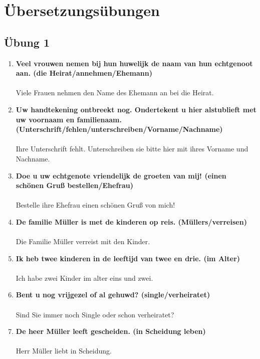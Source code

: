 \documentclass[main.tex]{subfiles}
\begin{document}
\chapter{Übersetzungsübungen}
\section{Übung 1}
\begin{enumerate}
\item \textbf{Veel vrouwen nemen bij hun huwelijk de naam van hun echtgenoot aan. (die Heirat/annehmen/Ehemann)}\\ \\
Viele Frauen nehmen den Name des Ehemann an bei die Heirat.\\
\item \textbf{Uw handtekening ontbreekt nog. Ondertekent u hier alstublieft met uw voornaam en familienaam. (Unterschrift/fehlen/unterschreiben/Vorname/Nachname)}\\ \\
Ihre Unterschrift fehlt. Unterschreiben sie bitte hier mit ihres Vorname und Nachname.
\\
\item \textbf{Doe u uw echtgenote vriendelijk de groeten van mij! (einen schönen Gruß bestellen/Ehefrau)}\\ \\
Bestelle ihre Ehefrau einen schönen Gruß von mich!
\\
\item \textbf{De familie Müller is met de kinderen op reis. (Müllers/verreisen)}\\ \\
Die Familie Müller verreist mit den Kinder.
\\
\item \textbf{Ik heb twee kinderen in de leeftijd van twee en drie. (im Alter)}\\ \\
Ich habe zwei Kinder im alter eins und zwei.
\\
\item \textbf{Bent u nog vrijgezel of al gehuwd? (single/verheiratet)}\\ \\
Sind Sie immer noch Single oder schon verheiratet?
\\
\item \textbf{De heer Müller leeft gescheiden. (in Scheidung leben)}\\ \\
Herr Müller liebt in Scheidung.

\end{enumerate}
\end{document}
